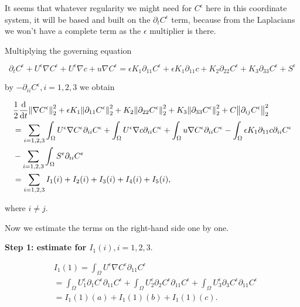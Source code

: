 \documentclass[11pt]{article}
\newcommand*\diff{\mathop{}\!\mathrm{d}}
\begin{document}
 It seems that whatever regularity we might need for $C^\epsilon$ here in this coordinate system, it will be based and built on the $\partial_t C^\epsilon$ term, because from the Laplacians we won't have a complete term as the $\epsilon$ multiplier is there.
    
Multiplying the governing equation

$$ \partial_t C^\epsilon + U^\epsilon \nabla C^\epsilon  + U^\epsilon \nabla c+ u \nabla C^\epsilon = \epsilon K_1 \partial_{11} C^\epsilon + \epsilon K_1 \partial_{11} c + K_2 \partial_{22} C^\epsilon + K_3 \partial_{33} C^\epsilon + S^\epsilon $$

by $- \partial_{ii} C^\epsilon, i=1,2,3$ we obtain

\begin{equation}
  \begin{split}
      & \frac{1}{2}\frac{\diff}{\diff t} \norm{\nabla C^\epsilon}_2^2 + \epsilon K_1 \norm{\partial_{11} C^\epsilon}_2^2 + K_2 \norm{\partial_{22} C^\epsilon}_2^2 + K_3 \norm{\partial_{33} C^\epsilon}_2^2 + C \norm{\partial_{ij} C^\epsilon}_2^2 \\
      & = \sum_{i = 1,2,3} \int_\Omega U^\epsilon \nabla C^\epsilon \partial_{ii} C^\epsilon + \int_\Omega U^\epsilon \nabla c \partial_{ii} C^\epsilon + \int_\Omega u \nabla C^\epsilon \partial_{ii} C^\epsilon - \int_\Omega \epsilon K_1 \partial_{11} c \partial_{ii} C^\epsilon \\
      & - \sum_{i = 1,2,3} \int_\Omega S^\epsilon \partial_{ii} C^\epsilon \\
      & = \sum_{i = 1,2,3} I_1(i)  + I_2(i) + I_3(i) + I_4(i) + I_5(i),
  \end{split}
\end{equation}

where $i \neq j.$

Now we estimate the terms on the right-hand side one by one.

\textbf{Step 1: estimate for $I_1(i), i = 1,2,3.$}

\begin{equation}
  \begin{split}
    & I_1(1) = \int_\Omega U^\epsilon \nabla C^\epsilon \partial_{11} C^\epsilon \\
    & = \int_\Omega U_1^\epsilon \partial_1 C^\epsilon \partial_{11} C^\epsilon + \int_\Omega U_2^\epsilon \partial_2 C^\epsilon \partial_{11} C^\epsilon + \int_\Omega U_3^\epsilon \partial_3 C^\epsilon \partial_{11} C^\epsilon \\
    & = I_1(1)(a) + I_1(1)(b) + I_1(1)(c).
  \end{split}
\end{equation}
\end{document}
